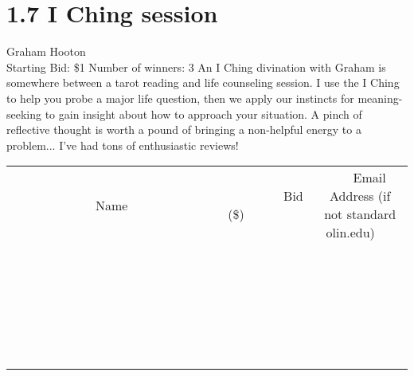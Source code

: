 \documentclass[11pt]{article}
\begin{document}
\section*{1.7 I Ching session}
Graham Hooton
\\
Starting Bid: \$1
\newline
Number of winners: 3
\newline
An I Ching divination with Graham is somewhere between a tarot reading and life counseling session. I use the I Ching to help you probe a major life question, then we apply our instincts for meaning-seeking to gain insight about how to approach your situation. 
A pinch of reflective thought is worth a pound of bringing a non-helpful energy to a problem... I've had tons of enthusiastic reviews!
\\[6ex]
\begin{tabular}{c c c}
~~~~~~~~~~~~~Name~~~~~~~~~~~~~ & ~~~~~~~~~Bid (\$)~~~~~~~~~  & ~~~Email Address (if not standard olin.edu)~~~\\
 & & \\
\hline
 & & \\
\hline
 & & \\
\hline
 & & \\
\hline
 & & \\
\hline
 & & \\
\hline
 & & \\
\hline
 & & \\
\hline
 & & \\
\hline
 & & \\
\hline
 & & \\
\hline
 & & \\
\hline
 & & \\
\hline
 & & \\
\hline
 & & \\
\hline
 & & \\
\hline
 & & \\
\hline
 & & \\
\hline
 & & \\
\hline
 & & \\
\hline
 & & \\
\hline
 & & \\
\hline
 & & \\
\hline
 & & \\
\hline
 & & \\
\hline
 & & \\
\hline
\end{tabular}
\newpage
\end{document}
